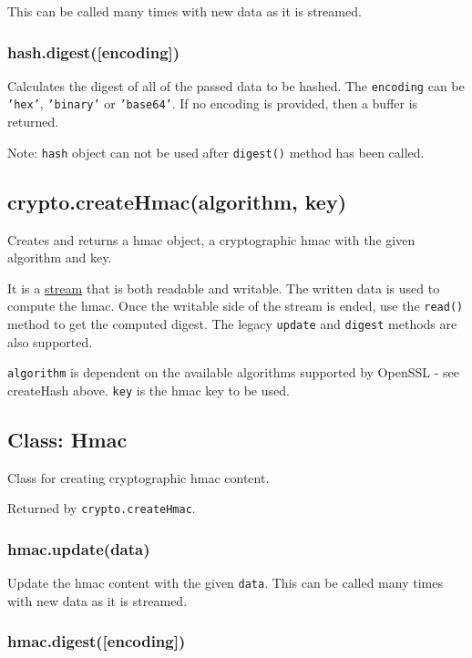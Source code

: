 This can be called many times with new data as it is streamed.

\subsubsection{hash.digest({[}encoding{]})}

Calculates the digest of all of the passed data to be hashed. The
\texttt{encoding} can be \texttt{'hex'}, \texttt{'binary'} or
\texttt{'base64'}. If no encoding is provided, then a buffer is
returned.

Note: \texttt{hash} object can not be used after \texttt{digest()}
method has been called.

\subsection{crypto.createHmac(algorithm, key)}

Creates and returns a hmac object, a cryptographic hmac with the given
algorithm and key.

It is a \href{stream.html}{stream} that is both readable and writable.
The written data is used to compute the hmac. Once the writable side of
the stream is ended, use the \texttt{read()} method to get the computed
digest. The legacy \texttt{update} and \texttt{digest} methods are also
supported.

\texttt{algorithm} is dependent on the available algorithms supported by
OpenSSL - see createHash above. \texttt{key} is the hmac key to be used.

\subsection{Class: Hmac}

Class for creating cryptographic hmac content.

Returned by \texttt{crypto.createHmac}.

\subsubsection{hmac.update(data)}

Update the hmac content with the given \texttt{data}. This can be called
many times with new data as it is streamed.

\subsubsection{hmac.digest({[}encoding{]})}

